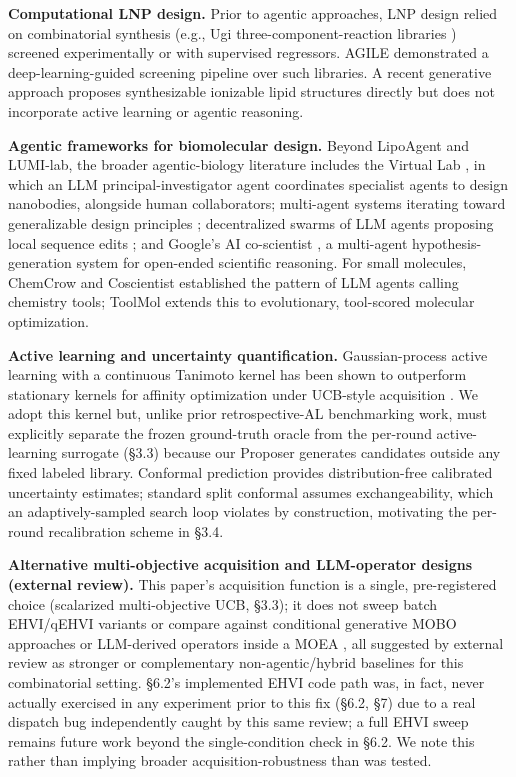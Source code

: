 \documentclass{article}
\begin{document}
\textbf{Computational LNP design.} Prior to agentic approaches, LNP design
relied on combinatorial synthesis (e.g., Ugi three-component-reaction
libraries \citep{xu2023ugi}) screened experimentally or with supervised
regressors. AGILE \citep{xu2024agile} demonstrated a deep-learning-guided
screening pipeline over such libraries. A recent generative approach
proposes synthesizable ionizable lipid structures directly
\citep{zhu2024generative} but does not incorporate active learning or
agentic reasoning.

\textbf{Agentic frameworks for biomolecular design.} Beyond LipoAgent and
LUMI-lab, the broader agentic-biology literature includes the Virtual Lab
\citep{swanson2025virtuallab}, in which an LLM principal-investigator agent
coordinates specialist agents to design nanobodies, alongside human
collaborators; multi-agent systems iterating toward generalizable design
principles \citep{protagents2025}; decentralized swarms of LLM agents
proposing local sequence edits \citep{swarmdesign2025}; and Google's AI
co-scientist \citep{gottweis2026}, a multi-agent hypothesis-generation
system for open-ended scientific reasoning. For small molecules, ChemCrow
\citep{bran2023chemcrow} and Coscientist \citep{boiko2023coscientist}
established the pattern of LLM agents calling chemistry tools; ToolMol
\citep{toolmol2026} extends this to evolutionary, tool-scored molecular
optimization.

\textbf{Active learning and uncertainty quantification.} Gaussian-process
active learning with a continuous Tanimoto kernel has been shown to
outperform stationary kernels for affinity optimization under UCB-style
acquisition \citep{gessner2024,srinivas2009,rasmussen2006}. We adopt this
kernel but, unlike prior retrospective-AL benchmarking work, must
explicitly separate the frozen ground-truth oracle from the per-round
active-learning surrogate (\S3.3) because our Proposer generates candidates
outside any fixed labeled library. Conformal prediction
\citep{angelopoulos2023} provides distribution-free calibrated uncertainty
estimates; standard split conformal assumes exchangeability, which an
adaptively-sampled search loop violates by construction, motivating the
per-round recalibration scheme in \S3.4.

\textbf{Alternative multi-objective acquisition and LLM-operator designs
(external review).} This paper's acquisition function is a single,
pre-registered choice (scalarized multi-objective UCB, \S3.3); it does
not sweep batch EHVI/qEHVI variants \citep{ehvibatch2026verify} or
compare against conditional generative MOBO approaches
\citep{condgenmobo2023verify} or LLM-derived operators inside a MOEA
\citep{moealo2023verify}, all suggested by external review as stronger or
complementary non-agentic/hybrid baselines for this combinatorial
setting. \S6.2's implemented EHVI code path was, in fact, never actually
exercised in any experiment prior to this fix (\S6.2, \S7) due to a real
dispatch bug independently caught by this same review; a full EHVI sweep
remains future work beyond the single-condition check in \S6.2. We note
this rather than implying broader acquisition-robustness than was tested.
\end{document}
